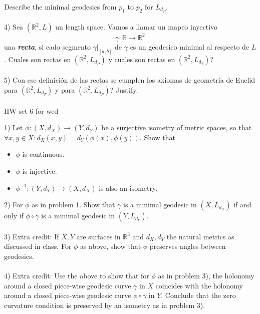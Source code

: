 \documentclass{amsart}
\begin{document}
Describe the minimal geodesics from $p _{1}$  to $p _{2}$ for $L _{d _{P}}$. 
\\\\
4) Sea $(\mathbb{R} ^{2}, L) $ un length space. Vamos
a llamar un mapeo inyectivo $$\gamma: \mathbb{R} ^{} \to
\mathbb{R} ^{2} $$ una \textbf{\emph{recta}}, si cado segmento $\gamma | _{[a,b]}$ de $\gamma$ es un geodesico minimal al respecto de $L$. Cuales son rectas en $(\mathbb{R} ^{2}, L _{d _{P}}) $
y cuales son rectas en $(\mathbb{R} ^{2}, L _{d _{T}}) $?
\\\\
5) Con ese definición de las rectas se cumplen los axiomas de geometría de Euclid para $(\mathbb{R} ^{2}, L _{d _{T}}) $ y para $(\mathbb{R} ^{2}, L _{d _{P}}) $? Justify.
\\\\
HW set 6 for wed

1) Let $\phi: (X, d _{X}) \to (Y, d _{Y})$ be a surjective
isometry of metric spaces, so that $\forall x,y \in X:
d _{X} (x, y) = d _{Y} (\phi (x), \phi (y))$. Show that
\begin{itemize}
\item  $\phi $ is continuous.
\item  $\phi $ is injective.
\item $\phi ^{-1}: (Y, d _{Y}) \to (X, d _{X}) $ is also an
isometry.
\end{itemize}
2) For $\phi $ as in problem 1. Show that $\gamma $ is
a minimal geodesic in $(X, L _{d _{X}})$ if and only if
$\phi \circ \gamma $ is a minimal geodesic in $(Y, L _{d _{Y}})$.
\\\\
3) Extra credit: If $X,Y$ are surfaces in $\mathbb{R} ^{3} $ and $d _{X},
d _{Y}$ the natural metrics as discussed in class. For $\phi $ as above, show that $\phi $ preserves angles between geodesics. 
\\\\
4) Extra credit: Use the above to show that for $\phi $ as
in problem 3), 
the holonomy around a closed piece-wise geodesic curve
$\gamma $ in $X$ coincides with the holonomy around a closed
piece-wise geodesic curve $\phi \circ \gamma $ in $Y$.
Conclude that the zero curvature condition is preserved by
an isometry as in problem 3).
\end{document}
